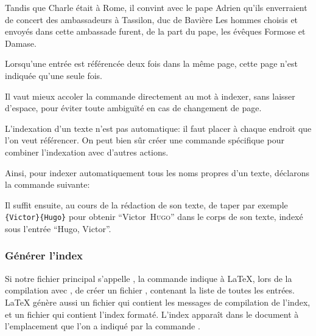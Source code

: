\begin{latexcode}
Tandis que Charle était à Rome, il convint
avec le pape Adrien qu’ils enverraient de concert
des ambassadeurs à Tassilon, duc de Bavière
\textelp{}
Les hommes choisis et envoyés dans cette ambassade furent, de 
la part du pape, les évêques Formose et 
Damase\textelp{}.
\end{latexcode}



Lorsqu'une entrée est référencée deux fois dans la même page, cette page n'est indiquée qu'une seule fois. 

\begin{attention}
Il vaut mieux accoler la commande  directement au  mot à indexer, sans laisser d'espace, pour éviter toute ambiguïté en cas de changement de page.
\end{attention}


L'indexation d'un texte n'est pas automatique: il faut placer  à chaque endroit  que l'on veut référencer. On  peut bien sûr créer une commande  spécifique pour combiner l'indexation avec d'autres actions.

Ainsi, pour indexer automatiquement tous les noms propres d'un texte, déclarons la commande suivante:\label{indexauteur}

\begin{latexcode}
\newcommand\auteur[2]{#1~\textsc{#2}\index{#2, #1}\xspace}
\end{latexcode}

\renewcommand\auteur[2]{#1~\textsc{#2}\xspace}

Il suffit ensuite, au cours de la rédaction de son texte, de taper par exemple \verb|{Victor}{Hugo}| pour obtenir \enquote{\auteur{Victor}{Hugo}} dans le corps de son texte, indexé sous l'entrée \enquote{Hugo, Victor}.


\subsubsection{Générer l'index}

Si notre fichier principal s'appelle ,  la commande  indique à \LaTeX{}, lors de la compilation avec \XeLaTeX, de créer un fichier , contenant la liste de toutes les entrées. 
\LaTeX{} génère aussi un fichier  qui contient les messages de compilation de l'index, et un fichier  qui contient l'index formaté.
L'index  apparaît dans le document à l'emplacement que l'on a indiqué par la commande .

